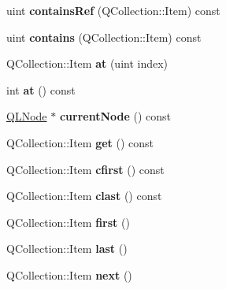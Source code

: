 \begin{DoxyCompactItemize}
\mbox{\label{class_q_g_list_ab852b3da6d4bacdbac6eec813dad5b01}} 
uint {\bfseries contains\+Ref} (Q\+Collection\+::\+Item) const
\item 
\mbox{\label{class_q_g_list_ae251f1aef8fdcd1637638e54bb1faadc}} 
uint {\bfseries contains} (Q\+Collection\+::\+Item) const
\item 
\mbox{\label{class_q_g_list_a11d85e4fabaa06c2329798884825f850}} 
Q\+Collection\+::\+Item {\bfseries at} (uint index)
\item 
\mbox{\label{class_q_g_list_aa44a6e180d90e5fc3d2b0e9cccbde9d1}} 
int {\bfseries at} () const
\item 
\mbox{\label{class_q_g_list_ae8276f7d2e1d4e6312ed34eee27700b3}} 
\mbox{\hyperlink{class_q_l_node}{Q\+L\+Node}} $\ast$ {\bfseries current\+Node} () const
\item 
\mbox{\label{class_q_g_list_a91c9e7afb5aa4ec795b0745e5b5b77d9}} 
Q\+Collection\+::\+Item {\bfseries get} () const
\item 
\mbox{\label{class_q_g_list_a05a0b3d2e5bd955ae191206c3b1c1176}} 
Q\+Collection\+::\+Item {\bfseries cfirst} () const
\item 
\mbox{\label{class_q_g_list_aaa4e903d79c3fb897aea2f5affae1e42}} 
Q\+Collection\+::\+Item {\bfseries clast} () const
\item 
\mbox{\label{class_q_g_list_a94d8739e67879c5d61350d18e7747e2b}} 
Q\+Collection\+::\+Item {\bfseries first} ()
\item 
\mbox{\label{class_q_g_list_afa40286cb52ff6fce42f9f7306283d9a}} 
Q\+Collection\+::\+Item {\bfseries last} ()
\item 
\mbox{\label{class_q_g_list_a16d0f7ae73881b4bfe6757e58b74d38a}} 
Q\+Collection\+::\+Item {\bfseries next} ()
\item 
\mbox{\label{class_q_g_list_a6dc328630d029edac6f0af6ce896be20}} 

\end{DoxyCompactItemize}
